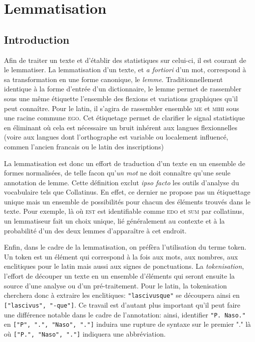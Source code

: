 \section{Lemmatisation}
\label{sec:lemmatiseurs}

\subsection{Introduction}
\label{subsec:lemma_intro}

Afin de traiter un texte et d'établir des statistiques sur celui-ci, il est courant de le lemmatiser. La lemmatisation d'un texte, et \textit{a fortiori} d'un mot, correspond à sa transformation en une forme canonique, le \textit{lemme}. Traditionnellement identique à la forme d'entrée d'un dictionnaire, le lemme permet de rassembler sous une même étiquette l'ensemble des flexions et variations graphiques qu'il peut connaître. Pour le latin, il s'agira de rassembler ensemble \textsc{me} et \textsc{mihi} sous une racine commune \textsc{ego}. Cet étiquetage permet de clarifier le signal statistique en éliminant où cela est nécessaire un bruit inhérent aux langues flexionnelles (voire aux langues dont l'orthographe est variable ou localement influencé, commen l'ancien francais ou le latin des inscriptions) %

La lemmatisation est donc un effort de traduction d'un texte en un ensemble de formes normalisées, de telle facon qu'\textit{un mot} ne doit connaître qu'une seule annotation de lemme. Cette définition exclut \textit{ipso facto} les outils d'analyse du vocabulaire tels que Collatinus. En effet, ce dernier ne propose pas un étiquettage unique mais un ensemble de possibilités pour chacun des éléments trouvés dans le texte. Pour exemple, là où \textsc{est} est identifiable comme \textsc{edo} et \textsc{sum} par collatinus, un lemmatiseur fait un choix unique, lié généralement au contexte et à la probabilité d'un des deux lemmes d'apparaître à cet endroit.

Enfin, dans le cadre de la lemmatisation, on préfèra l'utilisation du terme token. Un token est un élément qui correspond à la fois aux mots, aux nombres, aux enclitiques pour le latin mais aussi aux signes de ponctuations. La \textit{tokenisation}, l'effort de découper un texte en un ensemble d'éléments qui seront ensuite la source d'une analyse ou d'un pré-traitement. Pour le latin, la tokenisation cherchera donc à extraire les enclitiques: \texttt{"lascivusque"} se découpera ainsi en \texttt{["lascivus", "-que"]}. Ce travail est d'autant plus important qu'il peut faire une différence notable dans le cadre de l'annotation: ainsi, identifier \texttt{"P. Naso."} en \texttt{["P", ".", "Naso", "."]} induira une rupture de syntaxe sur le premier "." là où \texttt{["P.", "Naso", "."]} indiquera une abbréviation.

